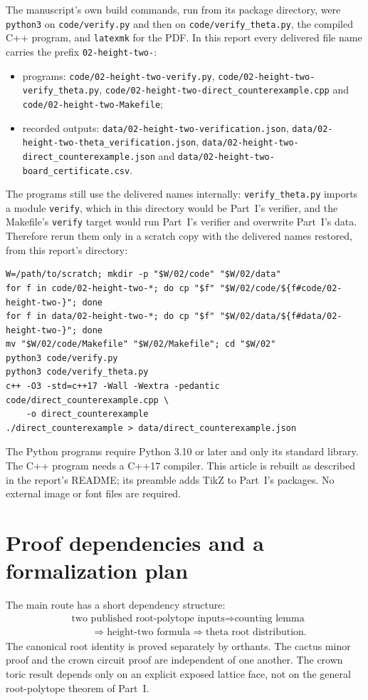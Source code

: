 \documentclass[11pt]{article}
\numberwithin{equation}{section}
\theoremstyle{definition}
\begin{document}
The manuscript's own build commands, run from its package directory, were
\texttt{python3} on \nolinkurl{code/verify.py} and then on
\nolinkurl{code/verify_theta.py}, the compiled C++ program, and
\texttt{latexmk} for the PDF. In this report every delivered file name
carries the prefix \texttt{02-height-two-}:
\begin{itemize}[leftmargin=1.4em,itemsep=0pt]\raggedright
\item programs: \nolinkurl{code/02-height-two-verify.py},
 \nolinkurl{code/02-height-two-verify_theta.py},
 \nolinkurl{code/02-height-two-direct_counterexample.cpp} and
 \nolinkurl{code/02-height-two-Makefile};
\item recorded outputs: \nolinkurl{data/02-height-two-verification.json},
 \nolinkurl{data/02-height-two-theta_verification.json},
 \nolinkurl{data/02-height-two-direct_counterexample.json} and
 \nolinkurl{data/02-height-two-board_certificate.csv}.
\end{itemize}
The programs still use the delivered names internally: \texttt{verify\_theta.py} imports a module
\texttt{verify}, which in this directory would be Part~I's verifier, and the
Makefile's \texttt{verify} target would run Part~I's verifier and overwrite
Part~I's data. Therefore rerun them only in a scratch copy with the delivered
names restored, from this report's directory:
\begin{lstlisting}
W=/path/to/scratch; mkdir -p "$W/02/code" "$W/02/data"
for f in code/02-height-two-*; do cp "$f" "$W/02/code/${f#code/02-height-two-}"; done
for f in data/02-height-two-*; do cp "$f" "$W/02/data/${f#data/02-height-two-}"; done
mv "$W/02/code/Makefile" "$W/02/Makefile"; cd "$W/02"
python3 code/verify.py
python3 code/verify_theta.py
c++ -O3 -std=c++17 -Wall -Wextra -pedantic code/direct_counterexample.cpp \
    -o direct_counterexample
./direct_counterexample > data/direct_counterexample.json
\end{lstlisting}
The Python programs require Python 3.10 or later and only its standard
library. The C++ program needs a C++17 compiler. This article is rebuilt as
described in the report's README; its preamble adds TikZ to Part~I's
packages. No external image or font files are required.

\section{Proof dependencies and a formalization plan}\label{htwo:sec:audit}

The main route has a short dependency structure:
\begin{align*}
 &\text{two published root-polytope inputs}
   \Longrightarrow \text{counting lemma}\\
 &\hspace{2em}\Longrightarrow \text{height-two formula}
   \Longrightarrow \text{theta root distribution}.
\end{align*}
The canonical root identity is proved separately by orthants. The cactus
minor proof and the crown circuit proof are independent of one another.
The crown toric result depends only on an explicit exposed lattice face,
not on the general root-polytope theorem of Part~I.
\end{document}

